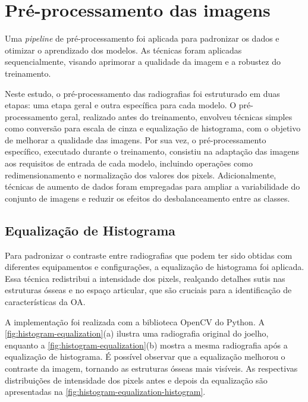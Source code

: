 \section{Pré-processamento das imagens}

Uma \textit{pipeline} de pré-processamento foi aplicada para padronizar os dados e otimizar o aprendizado dos modelos. As técnicas foram aplicadas sequencialmente, visando aprimorar a qualidade da imagem e a robustez do treinamento.

Neste estudo, o pré-processamento das radiografias foi estruturado em duas etapas: uma etapa geral e outra específica para cada modelo. O pré-processamento geral, realizado antes do treinamento, envolveu técnicas simples como conversão para escala de cinza e equalização de histograma, com o objetivo de melhorar a qualidade das imagens. Por sua vez, o pré-processamento específico, executado durante o treinamento, consistiu na adaptação das imagens aos requisitos de entrada de cada modelo, incluindo operações como redimensionamento e normalização dos valores dos pixels. Adicionalmente, técnicas de aumento de dados foram empregadas para ampliar a variabilidade do conjunto de imagens e reduzir os efeitos do desbalanceamento entre as classes.

\subsection{Equalização de Histograma}

Para padronizar o contraste entre radiografias que podem ter sido obtidas com diferentes equipamentos e configurações, a equalização de histograma foi aplicada. Essa técnica redistribui a intensidade dos pixels, realçando detalhes sutis nas estruturas ósseas e no espaço articular, que são cruciais para a identificação de características da OA.

A implementação foi realizada com a biblioteca OpenCV \cite{opencv} do Python. A \autoref{fig:histogram-equalization}(a) ilustra uma radiografia original do joelho, enquanto a \autoref{fig:histogram-equalization}(b) mostra a mesma radiografia após a equalização de histograma. É possível observar que a equalização melhorou o contraste da imagem, tornando as estruturas ósseas mais visíveis. As respectivas distribuições de intensidade dos pixels antes e depois da equalização são apresentadas na \autoref{fig:histogram-equalization-histogram}.

